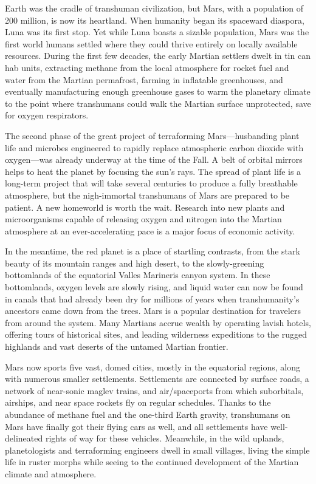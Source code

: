 Earth was the cradle of transhuman civilization, but Mars, with a population of 200 million, is now its heartland. When humanity began its spaceward diaspora, Luna was its first stop. Yet while Luna boasts a sizable population, Mars was the first world humans settled where they could thrive entirely on locally available resources. During the first few decades, the early Martian settlers dwelt in tin can hab units, extracting methane from the local atmosphere for rocket fuel and water from the Martian permafrost, farming in inflatable greenhouses, and eventually manufacturing enough greenhouse gases to warm the planetary climate to the point where transhumans could walk the Martian surface unprotected, save for oxygen respirators. 

The second phase of the great project of terraforming Mars—husbanding plant life and microbes engineered to rapidly replace atmospheric carbon dioxide with oxygen—was already underway at the time of the Fall. A belt of orbital mirrors helps to heat the planet by focusing the sun's rays. The spread of plant life is a long-term project that will take several centuries to produce a fully breathable atmosphere, but the nigh-immortal transhumans of Mars are prepared to be patient. A new homeworld is worth the wait. Research into new plants and microorganisms capable of releasing oxygen and nitrogen into the Martian atmosphere at an ever-accelerating pace is a major focus of economic activity. 

In the meantime, the red planet is a place of startling contrasts, from the stark beauty of its mountain ranges and high desert, to the slowly-greening bottomlands of the equatorial Valles Marineris canyon system. In these bottomlands, oxygen levels are slowly rising, and liquid water can now be found in canals that had already been dry for millions of years when transhumanity's ancestors came down from the trees. Mars is a popular destination for travelers from around the system. Many Martians accrue wealth by operating lavish hotels, offering tours of historical sites, and leading wilderness expeditions to the rugged highlands and vast deserts of the untamed Martian frontier. 

Mars now sports five vast, domed cities, mostly in the equatorial regions, along with numerous smaller settlements. Settlements are connected by surface roads, a network of near-sonic maglev trains, and air/spaceports from which suborbitals, airships, and near space rockets fly on regular schedules. Thanks to the abundance of methane fuel and the one-third Earth gravity, transhumans on Mars have finally got their flying cars as well, and all settlements have well-delineated rights of way for these vehicles. Meanwhile, in the wild uplands, planetologists and terraforming engineers dwell in small villages, living the simple life in ruster morphs while seeing to the continued development of the Martian climate and atmosphere. 

